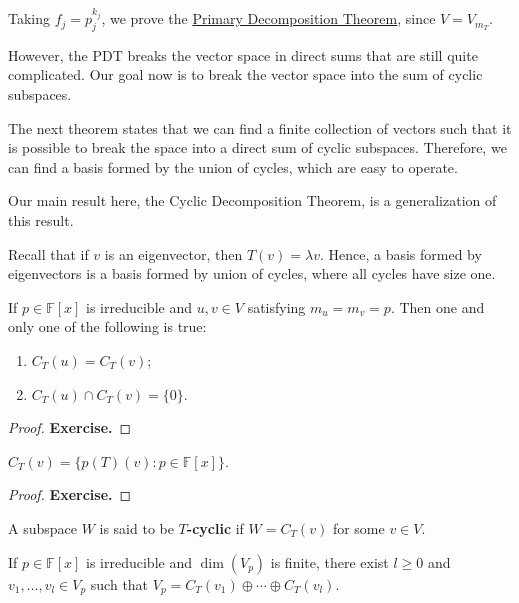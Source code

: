 Taking $f_j = p_j^{k_j}$, we prove the \hyperref[thm:pdt]{Primary Decomposition Theorem}, since $V = V_{m_T}$.

However, the PDT breaks the vector space in direct sums that are still quite complicated. Our goal now is to break the vector space into the sum of cyclic subspaces. 

The next theorem states that we can find a finite collection of vectors such that it is possible to break the space into a direct sum of cyclic subspaces. Therefore, we can find a basis formed by the union of cycles, which are easy to operate.

Our main result here, the Cyclic Decomposition Theorem, is a generalization of this result.

Recall that if $v$ is an eigenvector, then $T(v) = \lambda v$. Hence, a basis formed by eigenvectors is a basis formed by union of cycles, where all cycles have size one. 

\begin{lemma}\label{lemma:202210200909}
	If $p \in \mathbb{F}[x]$ is irreducible and $u, v \in V$ satisfying $m_u = m_v = p$. Then one and only one of the following is true:
	\begin{enumerate}
		\item $C_T(u) = C_T(v)$;
		\item $C_T(u) \cap C_T(v) = \{ 0 \}$.
	\end{enumerate}
\end{lemma}

\begin{proof}
	\textbf{Exercise.}
\end{proof}

\begin{lemma}\label{lemma:202210200910}
	$C_T(v) = \{ p(T)(v) : p \in \mathbb{F}[x] \}$.
\end{lemma}

\begin{proof}
	\textbf{Exercise.}
\end{proof}

A subspace $W$ is said to be \textbf{$T$-cyclic} if $W = C_T(v)$ for some $v \in V$.

\begin{theorem}
	If $p \in \mathbb{F}[x]$ is irreducible and $\dim (V_p)$ is finite, there exist $l \geq 0$ and $v_1, \ldots, v_l \in V_p$ such that $V_p = C_T(v_1) \oplus \cdots \oplus C_T(v_l)$.
\end{theorem}


